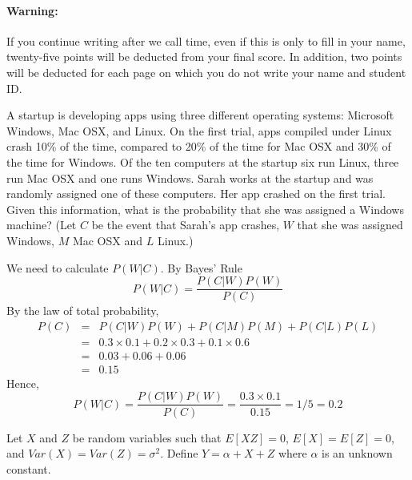 \documentclass[addpoints,12pt]{exam}
\begin{document}
\paragraph{Warning:} If you continue writing after we call time, even if this is only to fill in your name, twenty-five points will be deducted from your final score. In addition, two points will be deducted for each page on which you do not write your name and student ID. 

\newpage
\begin{questions}


\question[20] A startup is developing apps using three different operating systems: Microsoft Windows, Mac OSX, and Linux. On the first trial, apps compiled under Linux crash 10\% of the time, compared to 20\% of the time for Mac OSX and 30\% of the time for Windows. Of the ten computers at the startup six run Linux, three run Mac OSX and one runs Windows. Sarah works at the startup and was randomly assigned one of these computers. Her app crashed on the first trial. Given this information, what is the probability that she was assigned a Windows machine? (Let $C$ be the event that Sarah's app crashes, $W$ that she was assigned Windows, $M$ Mac OSX and $L$ Linux.)
	\begin{solution}[3in]
		We need to calculate $P(W|C)$. By Bayes' Rule
			$$P(W|C) = \frac{P(C|W)P(W)}{P(C)}$$
		By the law of total probability, 
			\begin{eqnarray*}
				P(C) &=& P(C|W)P(W) + P(C|M)P(M) + P(C|L)P(L)\\
					&=&0.3 \times 0.1 + 0.2 \times 0.3 + 0.1 \times 0.6\\
					&=& 0.03 + 0.06 + 0.06\\
					&=& 0.15
			\end{eqnarray*}
		Hence,
			$$P(W|C) = \frac{P(C|W)P(W)}{P(C)} = \frac{0.3 \times 0.1}{0.15}= 1/5 = 0.2$$
	\end{solution}



\question Let $X$ and $Z$ be random variables such that $E[XZ]=0$, $E[X] = E[Z] = 0$, and $Var(X) = Var(Z) = \sigma^2$. Define $Y = \alpha + X + Z$ where $\alpha$ is an unknown constant. 
\end{questions}
\end{document}

